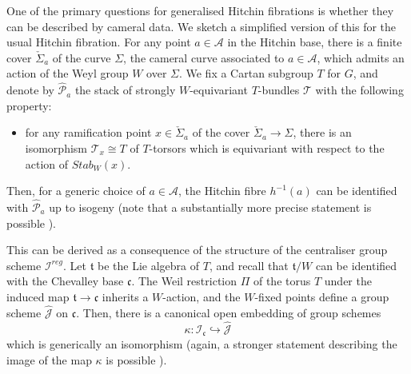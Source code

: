 \documentclass{amsart}
\theoremstyle{remark}
\numberwithin{theorem}{section}
\numberwithin{equation}{section}
\begin{document}
One of the primary questions for generalised Hitchin fibrations is whether they can be described by cameral data. We sketch a simplified version of this for the usual Hitchin fibration. For any point $a \in \mathcal A$ in the Hitchin base, there is a finite cover $\check{\Sigma}_a$ of the curve $\Sigma$, the cameral curve associated to $a \in \mathcal A$, which admits an action of the Weyl group $W$ over $\Sigma$. We fix a Cartan subgroup $T$ for $G$, and denote by $\hat{\mathcal P}_a$ the stack of strongly $W$-equivariant $T$-bundles $\mathcal T$ with the following property:
\begin{itemize}
    \item[$(*)$] for any ramification point $x \in \check{\Sigma}_a$ of the cover $\check{\Sigma}_a \rightarrow \Sigma$, there is an isomorphism $\mathcal T_x \cong T$ of $T$-torsors which is equivariant with respect to the action of $Stab_W(x)$.
\end{itemize}
Then, for a generic choice of $a \in  \mathcal A$, the Hitchin fibre $h^{-1}(a)$ can be identified with $\hat{\mathcal P}_a$ up to isogeny (note that a substantially more precise statement is possible \cite[Theorem 6.4]{DG}).

This can be derived as a consequence of the structure of the centraliser group scheme $\mathcal I^{reg}$. Let $\mathfrak{t}$ be the Lie algebra of $T$, and recall that $\mathfrak{t}/W$ can be identified with the Chevalley base $\mathfrak{c}$. The Weil restriction $\Pi$ of the torus $T$ under the induced map $\mathfrak{t} \rightarrow \mathfrak{c}$ inherits a $W$-action, and the $W$-fixed points define a group scheme $\hat{\mathcal J}$ on $\mathfrak{c}$. Then, there is a canonical open embedding of group schemes 
    \begin{equation}\label{RegCameralMoreqn}
        \kappa:\mathcal I_{\mathfrak{c}} \hookrightarrow \hat{\mathcal J}
    \end{equation}
which is generically an isomorphism \cite[Proposition 12.5]{DG} (again, a stronger statement describing the image of the map $\kappa$ is possible \cite[Theorem 11.6]{DG}).
\end{document}
